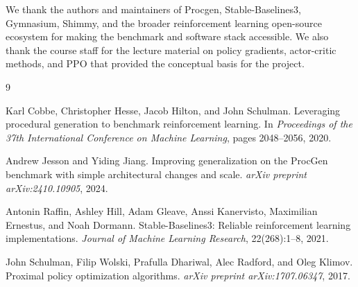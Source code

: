\documentclass[10pt,twocolumn]{article}
\begin{document}
We thank the authors and maintainers of Procgen, Stable-Baselines3, Gymnasium, Shimmy, and the broader reinforcement learning open-source ecosystem for making the benchmark and software stack accessible. We also thank the course staff for the lecture material on policy gradients, actor-critic methods, and PPO that provided the conceptual basis for the project.

\begin{thebibliography}{9}

Karl Cobbe, Christopher Hesse, Jacob Hilton, and John Schulman.
\newblock Leveraging procedural generation to benchmark reinforcement learning.
\newblock In \emph{Proceedings of the 37th International Conference on Machine Learning}, pages 2048--2056, 2020.

Andrew Jesson and Yiding Jiang.
\newblock Improving generalization on the ProcGen benchmark with simple architectural changes and scale.
\newblock \emph{arXiv preprint arXiv:2410.10905}, 2024.

Antonin Raffin, Ashley Hill, Adam Gleave, Anssi Kanervisto, Maximilian Ernestus, and Noah Dormann.
\newblock Stable-Baselines3: Reliable reinforcement learning implementations.
\newblock \emph{Journal of Machine Learning Research}, 22(268):1--8, 2021.

John Schulman, Filip Wolski, Prafulla Dhariwal, Alec Radford, and Oleg Klimov.
\newblock Proximal policy optimization algorithms.
\newblock \emph{arXiv preprint arXiv:1707.06347}, 2017.

\end{thebibliography}
\end{document}

